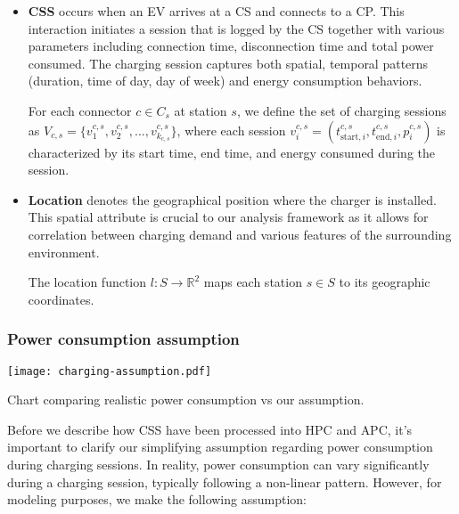 \begin{itemize}
    \item \textbf{\acrlong{CSS}} occurs when an \acrshort{EV} arrives at a \acrshort{CS} and connects to a \acrshort{CP}. This interaction initiates a session that is logged by the \acrshort{CS} together with various parameters including connection time, disconnection time and total power consumed. The charging session captures both spatial, temporal patterns (duration, time of day, day of week) and energy consumption behaviors.

          \vspace{3.5mm}

          For each connector $c \in C_s$ at station $s$, we define the set of charging sessions as $V_{c,s} = \{v_1^{c,s}, v_2^{c,s}, ..., v_{k_{c,s}}^{c,s}\}$, where each session $v_i^{c,s} = (t_{\text{start},i}^{c,s}, t_{\text{end},i}^{c,s}, p_i^{c,s})$ is characterized by its start time, end time, and energy consumed during the session.

    \item \textbf{Location} denotes the geographical position where the charger is installed. This spatial attribute is crucial to our analysis framework as it allows for correlation between charging demand and various features of the surrounding environment.

          \vspace{3.5mm}

          The location function $l: S \rightarrow \mathbb{R}^2$ maps each station $s \in S$ to its geographic coordinates.

\end{itemize}

\subsubsection{Power consumption assumption}

\begin{marginfigure}
    \texttt{[image: charging-assumption.pdf]}
    \caption[Charging assumption]{Chart comparing realistic power consumption vs our assumption.}
    \label{fig:charging-assumption}
\end{marginfigure}

Before we describe how \acrlong{CSS} have been processed into \acrlong{HPC} and \acrlong{APC}, it's important to clarify our simplifying assumption regarding power consumption during charging sessions. In reality, power consumption can vary significantly during a charging session, typically following a non-linear pattern. However, for modeling purposes, we make the following assumption:

